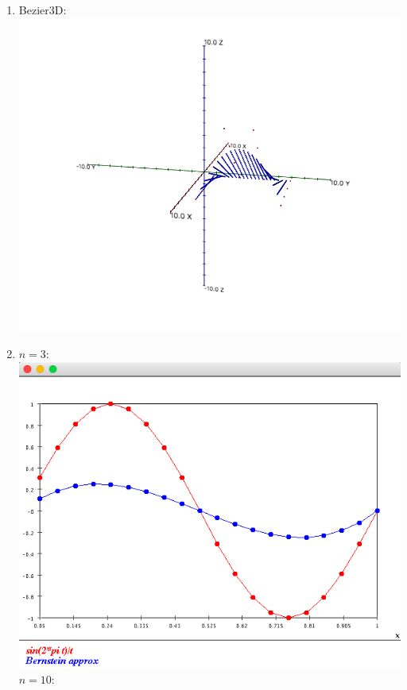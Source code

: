 \documentclass{article}
\begin{document}
\begin{enumerate}
\item Bezier3D: \\
\includegraphics[scale=0.3]{exercise30}
\item $n=3:$ \\
\includegraphics[scale=0.3]{bernstein_approx_3}\\
$n=10:$\\

\end{enumerate}
\end{document}
